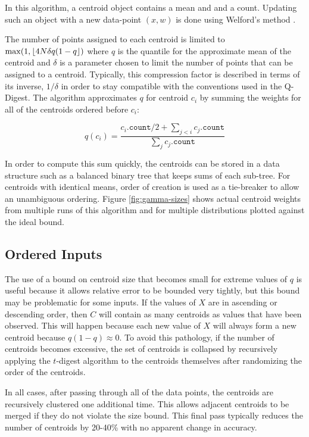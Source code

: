 \documentclass[11pt]{amsart}
\DeclarePairedDelimiter{\floor}{\lfloor}{\rfloor}
\begin{document}
In this algorithm, a centroid object contains a mean and and a count.  Updating such an object with a new data-point $(x,w)$ is done using Welford's method \cite{wiki:welford, knuth2welford, welford62}.

The number of points assigned to each centroid is limited to $\max(1, \floor{4N\delta q(1-q})$ where $q$ is the quantile for the approximate mean of the centroid and $\delta$ is a parameter chosen to limit the number of points that can be assigned to a centroid.  Typically, this compression factor is described in terms of its inverse, $1/\delta$ in order to stay compatible with the conventions used in the Q-Digest.  The algorithm approximates $q$ for centroid $c_i$ by summing the weights for all of the centroids ordered before $c_i$:

\[q(c_i)=\frac{c_i.\mathtt{count}/2 + \sum_{j<i}c_j.\mathtt{count}} {\sum_j c_j.\mathtt{count}}\]

In order to compute this sum quickly, the centroids can be stored in a data structure such as a balanced binary tree that keeps sums of each sub-tree.  For centroids with identical means, order of creation is used as a tie-breaker to allow an unambiguous ordering.  Figure \ref{fig:gamma-sizes} shows actual centroid weights from multiple runs of this algorithm and for multiple distributions plotted against the ideal bound.

\subsection{Ordered Inputs}
The use of a bound on centroid size that becomes small for extreme values of $q$ is useful because it allows relative error to be bounded very tightly, but this bound may be problematic for some inputs.  If the values of $X$ are in ascending or descending order, then $C$ will contain as many centroids as values that have been observed.  This will happen because each new value of $X$ will always form a new centroid because $q(1-q)\approx0$.  To avoid this pathology, if the number of centroids becomes excessive, the set of centroids is collapsed by recursively applying the $t$-digest algorithm to the centroids themselves after randomizing the order of the centroids.  

In all cases, after passing through all of the data points, the centroids are recursively clustered one additional time.  This allows adjacent centroids to be merged if they do not violate the size bound.  This final pass typically reduces the number of centroids by 20-40\% with no apparent change in accuracy.
\end{document}
